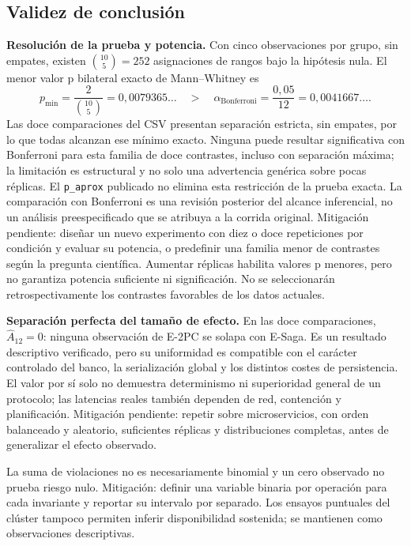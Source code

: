 \documentclass[12pt,a4paper]{article}
\begin{document}
\subsection{Validez de conclusión}
\textbf{Resolución de la prueba y potencia.} Con cinco observaciones por grupo, sin empates, existen \(\binom{10}{5}=252\) asignaciones de rangos bajo la hipótesis nula. El menor valor p bilateral exacto de Mann--Whitney es
\begin{equation}
p_{\min}=\frac{2}{\binom{10}{5}}=0{,}0079365\ldots
\quad > \quad
\alpha_{\mathrm{Bonferroni}}=\frac{0{,}05}{12}=0{,}0041667\ldots .
\label{eq:limite-mann-whitney}
\end{equation}
Las doce comparaciones del CSV presentan separación estricta, sin empates, por lo que todas alcanzan ese mínimo exacto. Ninguna puede resultar significativa con Bonferroni para esta familia de doce contrastes, incluso con separación máxima; la limitación es estructural y no solo una advertencia genérica sobre pocas réplicas. El \texttt{p\_aprox} publicado no elimina esta restricción de la prueba exacta. La comparación con Bonferroni es una revisión posterior del alcance inferencial, no un análisis preespecificado que se atribuya a la corrida original. Mitigación pendiente: diseñar un nuevo experimento con diez o doce repeticiones por condición y evaluar su potencia, o predefinir una familia menor de contrastes según la pregunta científica. Aumentar réplicas habilita valores p menores, pero no garantiza potencia suficiente ni significación. No se seleccionarán retrospectivamente los contrastes favorables de los datos actuales.

\textbf{Separación perfecta del tamaño de efecto.} En las doce comparaciones, \(\widehat A_{12}=0\): ninguna observación de E-2PC se solapa con E-Saga. Es un resultado descriptivo verificado, pero su uniformidad es compatible con el carácter controlado del banco, la serialización global y los distintos costes de persistencia. El valor por sí solo no demuestra determinismo ni superioridad general de un protocolo; las latencias reales también dependen de red, contención y planificación. Mitigación pendiente: repetir sobre microservicios, con orden balanceado y aleatorio, suficientes réplicas y distribuciones completas, antes de generalizar el efecto observado.

La suma de violaciones no es necesariamente binomial y un cero observado no prueba riesgo nulo. Mitigación: definir una variable binaria por operación para cada invariante y reportar su intervalo por separado. Los ensayos puntuales del clúster tampoco permiten inferir disponibilidad sostenida; se mantienen como observaciones descriptivas.
\end{document}
